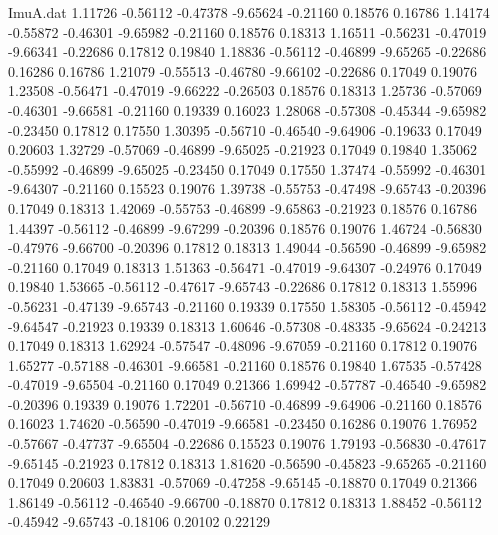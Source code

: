 \begin{filecontents}{ImuA.dat}
   1.11726   -0.56112   -0.47378   -9.65624   -0.21160    0.18576    0.16786
   1.14174   -0.55872   -0.46301   -9.65982   -0.21160    0.18576    0.18313
   1.16511   -0.56231   -0.47019   -9.66341   -0.22686    0.17812    0.19840
   1.18836   -0.56112   -0.46899   -9.65265   -0.22686    0.16286    0.16786
   1.21079   -0.55513   -0.46780   -9.66102   -0.22686    0.17049    0.19076
   1.23508   -0.56471   -0.47019   -9.66222   -0.26503    0.18576    0.18313
   1.25736   -0.57069   -0.46301   -9.66581   -0.21160    0.19339    0.16023
   1.28068   -0.57308   -0.45344   -9.65982   -0.23450    0.17812    0.17550
   1.30395   -0.56710   -0.46540   -9.64906   -0.19633    0.17049    0.20603
   1.32729   -0.57069   -0.46899   -9.65025   -0.21923    0.17049    0.19840
   1.35062   -0.55992   -0.46899   -9.65025   -0.23450    0.17049    0.17550
   1.37474   -0.55992   -0.46301   -9.64307   -0.21160    0.15523    0.19076
   1.39738   -0.55753   -0.47498   -9.65743   -0.20396    0.17049    0.18313
   1.42069   -0.55753   -0.46899   -9.65863   -0.21923    0.18576    0.16786
   1.44397   -0.56112   -0.46899   -9.67299   -0.20396    0.18576    0.19076
   1.46724   -0.56830   -0.47976   -9.66700   -0.20396    0.17812    0.18313
   1.49044   -0.56590   -0.46899   -9.65982   -0.21160    0.17049    0.18313
   1.51363   -0.56471   -0.47019   -9.64307   -0.24976    0.17049    0.19840
   1.53665   -0.56112   -0.47617   -9.65743   -0.22686    0.17812    0.18313
   1.55996   -0.56231   -0.47139   -9.65743   -0.21160    0.19339    0.17550
   1.58305   -0.56112   -0.45942   -9.64547   -0.21923    0.19339    0.18313
   1.60646   -0.57308   -0.48335   -9.65624   -0.24213    0.17049    0.18313
   1.62924   -0.57547   -0.48096   -9.67059   -0.21160    0.17812    0.19076
   1.65277   -0.57188   -0.46301   -9.66581   -0.21160    0.18576    0.19840
   1.67535   -0.57428   -0.47019   -9.65504   -0.21160    0.17049    0.21366
   1.69942   -0.57787   -0.46540   -9.65982   -0.20396    0.19339    0.19076
   1.72201   -0.56710   -0.46899   -9.64906   -0.21160    0.18576    0.16023
   1.74620   -0.56590   -0.47019   -9.66581   -0.23450    0.16286    0.19076
   1.76952   -0.57667   -0.47737   -9.65504   -0.22686    0.15523    0.19076
   1.79193   -0.56830   -0.47617   -9.65145   -0.21923    0.17812    0.18313
   1.81620   -0.56590   -0.45823   -9.65265   -0.21160    0.17049    0.20603
   1.83831   -0.57069   -0.47258   -9.65145   -0.18870    0.17049    0.21366
   1.86149   -0.56112   -0.46540   -9.66700   -0.18870    0.17812    0.18313
   1.88452   -0.56112   -0.45942   -9.65743   -0.18106    0.20102    0.22129

\end{filecontents}
